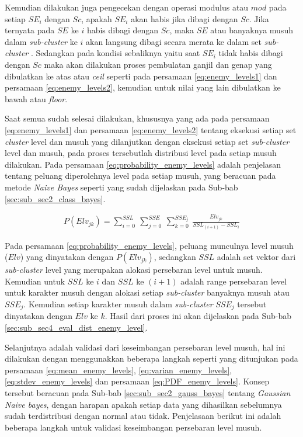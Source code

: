 Kemudian dilakukan juga pengecekan dengan operasi modulus atau $mod$ pada setiap $SE_{i}$ dengan $Sc$, apakah $SE_{i}$ akan habis jika dibagi dengan $Sc$. Jika ternyata pada $SE$ ke $i$ habis dibagi dengan $Sc$, maka $SE$ atau banyaknya musuh dalam \textit{sub-cluster} ke $i$ akan langsung dibagi secara merata ke dalam set \textit{sub-cluster} . Sedangkan pada kondisi sebaliknya yaitu saat $SE_{i}$ tidak habis dibagi dengan $Sc$ maka akan dilakukan proses pembulatan ganjil dan genap yang dibulatkan ke atas atau \textit{ceil} seperti pada persamaan \ref{eq:enemy_levels1} dan persamaan \ref{eq:enemy_levels2}, kemudian untuk nilai yang lain dibulatkan ke bawah atau \textit{floor}.
\vspace{1ex}

Saat semua sudah selesai dilakukan, khususnya yang ada pada persamaan \ref{eq:enemy_levels1} dan persamaan \ref{eq:enemy_levels2} tentang eksekusi setiap set \textit{cluster} level dan musuh yang dilanjutkan dengan eksekusi setiap set \textit{sub-cluster} level dan musuh, pada proses tersebutlah distribusi level pada setiap musuh dilakukan. Pada persamaan \ref{eq:probability_enemy_levels} adalah penjelasan tentang peluang diperolehnya level pada setiap musuh, yang beracuan pada metode \textit{Naive Bayes} seperti yang sudah dijelaskan pada Sub-bab \ref{sec:sub_sec2_class_bayes}.
\vspace{1ex}

\begin{equation}\label{eq:probability_enemy_levels}
\begin{split}
P(Elv_{jk}) = \sum_{i = 0}^{SSL}\ \sum_{j = 0}^{SSE}\ \sum_{k = 0}^{SSE_{j}}\ \frac{Elv_{jk}}{SSL_{(i + 1)} - SSL_{i}}
\end{split}
\end{equation}

Pada persamaan \ref{eq:probability_enemy_levels}, peluang munculnya level musuh ($Elv$) yang dinyatakan dengan $P(Elv_{jk})$, sedangkan $SSL$ adalah set vektor dari \textit{sub-cluster} level yang merupakan alokasi persebaran level untuk musuh. Kemudian untuk $SSL$ ke $i$ dan $SSL$ ke $(i + 1)$ adalah range persebaran level untuk karakter musuh dengan alokasi setiap \textit{sub-cluster} banyaknya musuh atau $SSE_{j}$. Kemudian setiap karakter musuh dalam \textit{sub-cluster} $SSE_{j}$ tersebut dinyatakan dengan $Elv$ ke $k$. Hasil dari proses ini akan dijelaskan pada Sub-bab \ref{sec:sub_sec4_eval_dist_enemy_level}.
\vspace{1ex}

Selanjutnya adalah validasi dari keseimbangan persebaran level musuh, hal ini dilakukan dengan menggunakkan beberapa langkah seperti yang ditunjukan pada persamaan \ref{eq:mean_enemy_levels}, \ref{eq:varian_enemy_levels}, \ref{eq:stdev_enemy_levels} dan persamaan \ref{eq:PDF_enemy_levels}. Konsep tersebut beracuan pada Sub-bab \ref{sec:sub_sec2_gauss_bayes} tentang \textit{Gaussian Naive bayes}, dengan harapan apakah setiap data yang dihasilkan sebelumnya sudah terdistribusi dengan normal atau tidak. Penjelasaan berikut ini adalah beberapa langkah untuk validasi keseimbangan persebaran level musuh.
\vspace{1ex}


